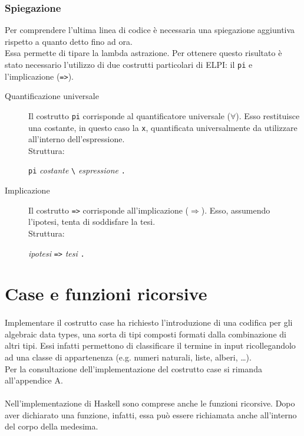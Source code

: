 \documentclass[12pt,a4paper,openright,twoside]{report}
\begin{document}
\subsubsection{Spiegazione}
Per comprendere l'ultima linea di codice è necessaria una spiegazione aggiuntiva rispetto a quanto detto fino ad ora.\\
Essa permette di tipare la lambda astrazione. Per ottenere questo risultato è stato necessario l'utilizzo di due costrutti particolari di ELPI: il \verb"pi" e l'implicazione (\verb"=>").\\
\begin{description}
 \item[Quantificazione universale] Il costrutto \verb"pi" corrisponde al quantificatore universale ($\forall$). Esso restituisce una costante, in questo caso la \verb"x", quantificata universalmente da utilizzare all'interno dell'espressione.\\
 Struttura:
 \begin{center}
  \verb"pi" \textit{costante} \verb"\" \textit{espressione} \verb"."
 \end{center}
 \item[Implicazione] Il costrutto \verb"=>" corrisponde all'implicazione ($\Rightarrow$). Esso, assumendo l'ipotesi, tenta di soddisfare la tesi.\\
 Struttura:
 \begin{center}
  \textit{ipotesi} \verb"=>" \textit{tesi} \verb"."
 \end{center}
\end{description}

\section{Case e funzioni ricorsive}

\paragraph{}
Implementare il costrutto case ha richiesto l'introduzione di una codifica per gli algebraic data types, una sorta di tipi composti formati dalla combinazione di altri tipi. Essi infatti permettono di classificare il termine in input ricollegandolo ad una classe di appartenenza (e.g. numeri naturali, liste, alberi, \ldots).\\
Per la consultazione dell'implementazione del costrutto case si rimanda all'appendice A.

\paragraph{}
Nell'implementazione di Haskell sono comprese anche le funzioni ricorsive. Dopo aver dichiarato una funzione, infatti, essa può essere richiamata anche all'interno del corpo della medesima.
\end{document}
